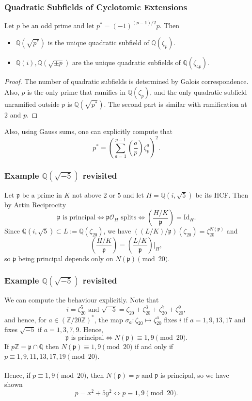 \documentclass{beamer}
\newcommand{\QQ}{\mathbb{Q}}
\newcommand{\ZZ}{\mathbb{Z}}
\newcommand{\pp}{\mathfrak{p}}
\theoremstyle{plain}
\begin{document}
\begin{frame}
    \frametitle{Quadratic Subfields of Cyclotomic Extensions}
    \begin{lemma}
        Let $p$ be an odd prime and let $p^*=(-1)^{(p-1)/2}p$. \pause Then
        \begin{itemize}
            \item $\QQ(\sqrt{p^*})$ is the unique quadratic subfield of $\QQ(\zeta_{p})$.\pause
            \item $\QQ(i), \QQ(\sqrt{\pm p})$ are the unique quadratic subfields of $\QQ(\zeta_{4p})$.
        \end{itemize}
    \end{lemma}
    \begin{proof}
        The number of quadratic subfields is determined by Galois correspondence. \pause Also, $p$ is the only prime that ramifies in $\QQ(\zeta_p)$, and the only quadratic subfield unramified outside $p$ is $\QQ(\sqrt{p^*})$. \pause The second part is similar with ramification at $2$ and $p$.
    \end{proof}
    \pause
    Also, using Gauss sums, one can explicitly compute that
    $$p^*=\left(\sum_{a=1}^{p-1}\left(\frac{a}{p}\right)\zeta_p^a\right)^2.$$
\end{frame}

\begin{frame}
    \frametitle{Example $\QQ(\sqrt{-5})$ revisited}
    Let $\pp$ be a prime in $K$ not above $2$ or $5$ and let $H=\QQ(i,\sqrt{5})$ be its HCF. \pause Then by Artin Reciprocity
    $$\pp\text{ is principal}\iff\pp\mathcal{O}_H\text{ splits}\iff \left(\frac{H/K}{\pp}\right)=\mathrm{Id}_{H}.$$
    \pause
    Since $\QQ(i,\sqrt{5})\subset L:=\QQ(\zeta_{20})$, we have $((L/K)/\pp)(\zeta_{20})=\zeta_{20}^{N(\pp)}$ and
    $$\left(\frac{H/K}{\pp}\right)=\left(\frac{L/K}{\pp}\right)\bigg|_H,$$
    \pause
    so $\pp$ being principal depends only on $N(\pp)\pmod{20}$.

\end{frame}

\begin{frame}
    \frametitle{Example $\QQ(\sqrt{-5})$ revisited}
    We can compute the behaviour explicitly. Note that 
    $$i=\zeta_{20}^5\text{ and }\sqrt{-5}=\zeta_{20}+\zeta_{20}^3+\zeta_{20}^{7}+\zeta_{20}^{9},$$\pause
    and hence, for $a\in(\ZZ/20\ZZ)^*$, the map $\sigma_a:\zeta_{20}\mapsto\zeta_{20}^a$ fixes $i$ if $a=1,9,13,17$ and fixes $\sqrt{-5}$ if $a=1,3,7,9$. \pause Hence,
    $$\pp \text{ is principal}\iff N(\pp)\equiv1,9\pmod{20}.$$\pause 
    If $p\ZZ=\pp\cap\QQ$ then $N(\pp)\equiv1,9\pmod{20}$ if and only if $p\equiv 1,9,11,13,17,19\pmod{20}$. \pause
    \\~\\
    Hence, if $p\equiv 1,9\pmod{20}$, then $N(\pp)=p$ and $\pp$ is principal, so we have shown
    $$p=x^2+5y^2\iff p\equiv1,9\pmod{20}.$$
\end{frame}
\end{document}
